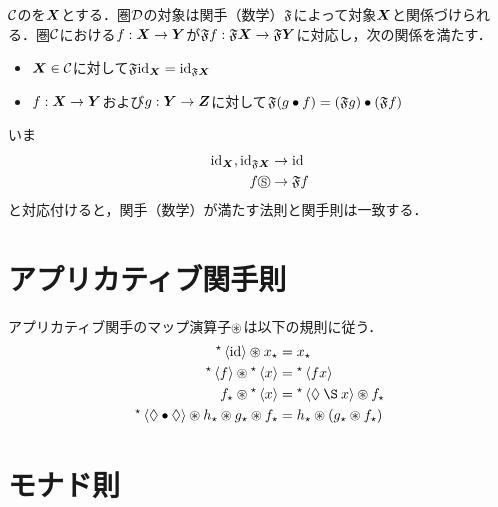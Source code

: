 \documentclass[platex,a5paper,twoside,fleqn,draft]{jsbook}
\newcommand{\keyword}[1]{\textgt{#1}}
\begin{document}
\keyword{圏}$\mathcal{C}$の\keyword{対象}を$\bm{X}$とする．圏$\mathcal{D}$の対象は関手（数学）$\mathfrak{F}$によって対象$\bm{X}$と関係づけられる．圏$\mathcal{C}$における\keyword{射}$f:\bm{X}\rightarrow\bm{Y}$が$\mathfrak{F}f:\mathfrak{F}\bm{X}\rightarrow\mathfrak{F}\bm{Y}$に対応し，次の関係を満たす．
\begin{itemize}
\item $\bm{X}\in\mathcal{C}$に対して$\mathfrak{F}\mathord{\mathrm{id}}_{\bm{X}}=\mathord{\mathrm{id}}_{\mathfrak{F}\bm{X}}$
\item $f:\bm{X}\rightarrow\bm{Y}$および$g:\bm{Y}\rightarrow\bm{Z}$に対して$\mathfrak{F}(g\mathbin{\bullet} f)=(\mathfrak{F}g)\mathbin{\bullet}(\mathfrak{F}f)$
\end{itemize}

いま
\begin{align}
\mathord{\mathrm{id}}_{\bm{X}},\mathord{\mathrm{id}}_{\mathfrak{F}\bm{X}}&\rightarrow\mathord{\mathrm{id}}\\
f\mathbin{\circledS}&\rightarrow\mathfrak{F}f
\end{align}
と対応付けると，関手（数学）が満たす法則と関手則は一致する．

\section{アプリカティブ関手則}

アプリカティブ関手のマップ演算子$\mathbin{\circledast}$は以下の規則に従う．
\begin{align}
\mathMakePure{\mathId}\mathApplicativeMap\mathPure{x}&=\mathPure{x}\\
\mathMakePure{f}\mathApplicativeMap\mathMakePure{x}&=\mathMakePure{fx}\\
\mathPure{f}\mathApplicativeMap\mathMakePure{x}&=\mathMakePure{\mathAnonymousParameter\mathApply x}\mathApplicativeMap\mathPure{f}\\
\mathMakePure{\mathAnonymousParameter\mathCompose\mathAnonymousParameter}\mathApplicativeMap\mathPure{h}\mathApplicativeMap\mathPure{g}\mathApplicativeMap\mathPure{f}
&=\mathPure{h}\mathApplicativeMap(\mathPure{g}\mathApplicativeMap\mathPure{f})
\end{align}

\section{モナド則}
\end{document}
